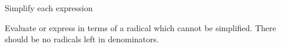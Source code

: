 \documentclass[12pt,letterpaper]{exam}
\begin{document}
\begin{questions}

\newpage
\addpoints
\question Simplify each expression


\newpage
\addpoints
\question Evaluate or express in terms of a radical which cannot be simplified. There should be no radicals left in denominators.




\end{questions}
\end{document}
